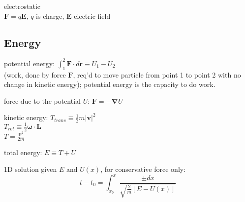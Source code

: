 \documentclass[letterpaper,landscape,10pt]{article}
\newenvironment{mydescription}
{\begin{description}
	\setlength{\itemsep}{0pt}
	\setlength{\parskip}{0pt}
	\setlength{\parsep}{-1pt}}
{\end{description}}
\begin{document}
{\begin{multicols}{3}
\begin{mydescription}
		\item[electrostatic] \  \\
			$\bm{F} = q\bm{E}$, $q$ is charge, $\bm{E}$ electric field
		\end{mydescription}
	
	\subsection*{Energy}
		\begin{mydescription}
			\item[potential energy:]
				$\displaystyle\int_1^2\bm{F}\cdot d\bm{r} \equiv U_1 - U_2$\\
				(work, done by force $\bm{F}$, req'd to move particle from
				point 1 to point 2 with no change in kinetic energy); potential
				energy is the capacity to do work.  \\
			\item[force due to the potential $U$:]
				$\bm{F} = -\bm{\nabla}U$  \\
			\item[kinetic energy:]
			    $T_{trans} \equiv \frac{1}{2}m|\bm{v}|^2$  \\
				$T_{rot} \equiv \frac{1}{2}\bm{\omega}\cdot\bm{L}$  \\
				$T = \frac{\bm{p}^2}{2m}$  \\
			\item[total energy:]
				$E \equiv T + U$  \\
			\item[1D solution given $E$ and $U(x)$,]
				for conservative force only:\\
				$$
					t-t_0 = \int_{x_0}^x\frac{\pm dx}
					{\sqrt{\frac{2}{m}\left[E-U(x)\right]}}
				$$
		\end{mydescription}

	

\end{multicols}}
\end{document}
